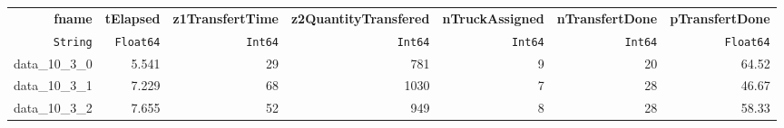 \begin{tabular}{rrrrrrr}
  \hline
  \textbf{fname} & \textbf{tElapsed} & \textbf{z1TransfertTime} & \textbf{z2QuantityTransfered} & \textbf{nTruckAssigned} & \textbf{nTransfertDone} & \textbf{pTransfertDone} \\
  \texttt{String} & \texttt{Float64} & \texttt{Int64} & \texttt{Int64} & \texttt{Int64} & \texttt{Int64} & \texttt{Float64} \\\hline
  data\_10\_3\_0 & 5.541 & 29 & 781 & 9 & 20 & 64.52 \\
  data\_10\_3\_1 & 7.229 & 68 & 1030 & 7 & 28 & 46.67 \\
  data\_10\_3\_2 & 7.655 & 52 & 949 & 8 & 28 & 58.33 \\\hline
\end{tabular}
